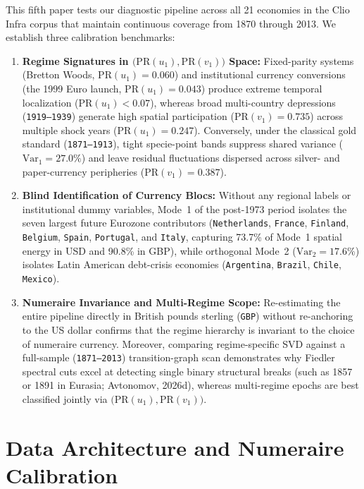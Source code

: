 \documentclass[11pt,a4paper]{article}
\begin{document}
This fifth paper tests our diagnostic pipeline across all 21 economies in the Clio Infra corpus that maintain continuous coverage from 1870 through 2013. We establish three calibration benchmarks:
\begin{enumerate}
    \item \textbf{Regime Signatures in $\big(\mathrm{PR}(u_1), \mathrm{PR}(v_1)\big)$ Space:} Fixed-parity systems (Bretton Woods, $\mathrm{PR}(u_1) = 0.060$) and institutional currency conversions (the 1999 Euro launch, $\mathrm{PR}(u_1) = 0.043$) produce extreme temporal localization ($\mathrm{PR}(u_1) < 0.07$), whereas broad multi-country depressions (\texttt{1919--1939}) generate high spatial participation ($\mathrm{PR}(v_1) = 0.735$) across multiple shock years ($\mathrm{PR}(u_1) = 0.247$). Conversely, under the classical gold standard (\texttt{1871--1913}), tight specie-point bands suppress shared variance ($\mathrm{Var}_1 = 27.0\%$) and leave residual fluctuations dispersed across silver- and paper-currency peripheries ($\mathrm{PR}(v_1) = 0.387$).
    \item \textbf{Blind Identification of Currency Blocs:} Without any regional labels or institutional dummy variables, Mode~1 of the post-1973 period isolates the seven largest future Eurozone contributors (\texttt{Netherlands}, \texttt{France}, \texttt{Finland}, \texttt{Belgium}, \texttt{Spain}, \texttt{Portugal}, and \texttt{Italy}, capturing 73.7\% of Mode~1 spatial energy in USD and 90.8\% in GBP), while orthogonal Mode~2 ($\mathrm{Var}_2 = 17.6\%$) isolates Latin American debt-crisis economies (\texttt{Argentina}, \texttt{Brazil}, \texttt{Chile}, \texttt{Mexico}).
    \item \textbf{Numeraire Invariance and Multi-Regime Scope:} Re-estimating the entire pipeline directly in British pounds sterling (\texttt{GBP}) without re-anchoring to the US dollar confirms that the regime hierarchy is invariant to the choice of numeraire currency. Moreover, comparing regime-specific SVD against a full-sample (\texttt{1871--2013}) transition-graph scan demonstrates why Fiedler spectral cuts excel at detecting single binary structural breaks (such as 1857 or 1891 in Eurasia; Avtonomov, 2026d), whereas multi-regime epochs are best classified jointly via $\big(\mathrm{PR}(u_1), \mathrm{PR}(v_1)\big)$.
\end{enumerate}

\section{Data Architecture and Numeraire Calibration}
\end{document}
